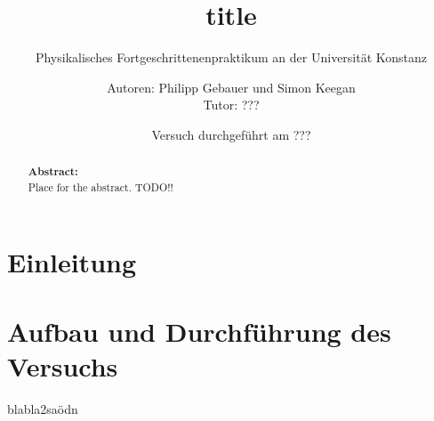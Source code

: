 

 
 \title{title}
 \subtitle{Physikalisches Fortgeschrittenenpraktikum an der Universität Konstanz}
 \author{Autoren: Philipp Gebauer und Simon Keegan \\ \large{Tutor: ???}}
 \date{Versuch durchgeführt am ???}
 \maketitle
 \vspace{2.5 cm}
 \begin{abstract}
     \noindent \textbf{Abstract:}\\
     Place for the abstract. TODO!!
     \vspace{1cm}
     
 \end{abstract}
 \thispagestyle{empty}
 \newpage
 
 \tableofcontents
 \thispagestyle{empty}
 \newpage
 \setcounter{page}{1}    
 
\section{Einleitung}
\section{Aufbau und Durchführung des Versuchs}
 
     
     \newpage
     
 
 \listoffigures
 
 blabla2saödn
 
 